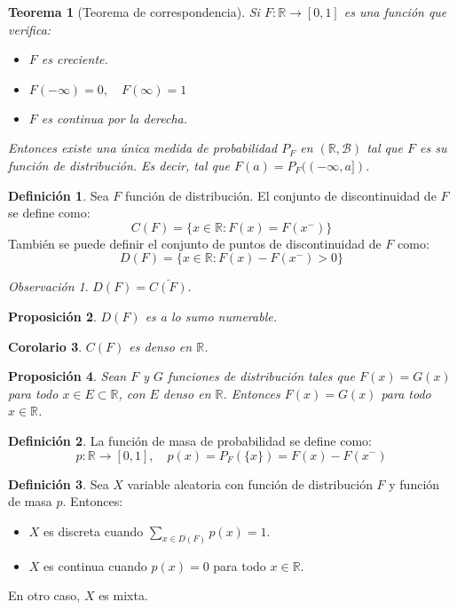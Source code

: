\documentclass{report}
\newtheorem{theorem}{Teorema}[chapter]
\newtheorem{corollary}[theorem]{Corolario}
\newtheorem{proposition}[theorem]{Proposición}
\theoremstyle{remark}
\newtheorem*{remark}{Observación}
\theoremstyle{remark}
\theoremstyle{remark}
\theoremstyle{definition}
\newtheorem{definition}{Definición}[chapter]
\theoremstyle{definition}
\theoremstyle{definition}
\theoremstyle{definition}
\begin{document}
\begin{theorem}[Teorema de correspondencia]
    Si $F: \mathbb{R} \to [0, 1]$ es una función que verifica:
    \begin{itemize}
        \item $F$ es creciente.
        \item $F(-\infty) = 0, \quad F(\infty) = 1$
        \item $F$ es continua por la derecha.
    \end{itemize}
    Entonces existe una única medida de probabilidad $P_F$ en $(\mathbb{R}, \mathcal{B})$ tal que $F$ es su función de distribución.
    Es decir, tal que $F(a) = P_F((-\infty, a])$.
\end{theorem}

\begin{definition}
    Sea $F$ función de distribución.
    El conjunto de discontinuidad de $F$ se define como:
    $$C(F) = \{ x \in \mathbb{R} : F(x) = F(x^-) \}$$
    También se puede definir el conjunto de puntos de discontinuidad de $F$ como:
    $$D(F) = \{ x \in \mathbb{R} : F(x) - F(x^-) > 0 \}$$
\end{definition}

\begin{remark}
    $D(F) = \bar{C(F)}$.
\end{remark}

\begin{proposition}
    $D(F)$ es a lo sumo numerable.
\end{proposition}

\begin{corollary}
    $C(F)$ es denso en $\mathbb{R}$.
\end{corollary}

\begin{proposition}
    Sean $F$ y $G$ funciones de distribución tales que $F(x) = G(x)$ para todo $x \in E \subset \mathbb{R}$, con $E$ denso en $\mathbb{R}$.
    Entonces $F(x) = G(x)$ para todo $x \in \mathbb{R}$.
\end{proposition}

\begin{definition}
    La función de masa de probabilidad se define como:
    $$p : \mathbb{R} \to [0, 1], \quad p(x) = P_F(\{x\}) = F(x) - F(x^-)$$
\end{definition}

\begin{definition}
    Sea $X$ variable aleatoria con función de distribución $F$ y función de masa $p$.
    Entonces:
    \begin{itemize}
        \item $X$ es discreta cuando $\sum_{x \in D(F)} p(x) = 1$.
        \item $X$ es continua cuando $p(x) = 0$ para todo $x \in \mathbb{R}$.
    \end{itemize}
    En otro caso, $X$ es mixta.
\end{definition}
\end{document}
